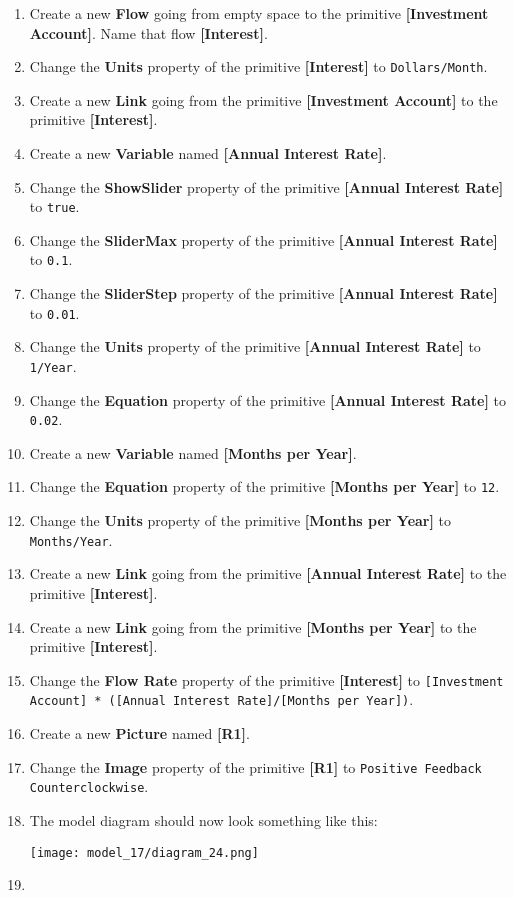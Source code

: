 \documentclass[]{memoir}
\makeatletter
\def\maxwidth{\ifdim\Gin@nat@width>\linewidth\linewidth
\else\Gin@nat@width\fi}
\let\Oldincludegraphics\includegraphics
\renewcommand{\includegraphics}[1]{\Oldincludegraphics[width=\maxwidth]{#1}}
\newcommand{\p}[1]{\textbf{{[}#1{]}}}
\newcommand{\e}[1]{\texttt{#1}}
\renewcommand{\a}[1]{\textbf{#1}}
\makeatother
\begin{document}
\begin{oframed}
\begin{enumerate}
\item Create a new \a{Flow} going from empty space to the primitive \p{Investment Account}. Name that flow \p{Interest}.
\item  Change the \a{Units} property of the primitive \p{Interest} to \e{Dollars/Month}.
\item Create a new \a{Link} going from the primitive \p{Investment Account} to the primitive \p{Interest}.
\item Create a new \a{Variable} named \p{Annual Interest Rate}.
\item  Change the \a{ShowSlider} property of the primitive \p{Annual Interest Rate} to \e{true}.
\item  Change the \a{SliderMax} property of the primitive \p{Annual Interest Rate} to \e{0.1}.
\item  Change the \a{SliderStep} property of the primitive \p{Annual Interest Rate} to \e{0.01}.
\item  Change the \a{Units} property of the primitive \p{Annual Interest Rate} to \e{1/Year}.
\item  Change the \a{Equation} property of the primitive \p{Annual Interest Rate} to \e{0.02}.
\item Create a new \a{Variable} named \p{Months per Year}.
\item  Change the \a{Equation} property of the primitive \p{Months per Year} to \e{12}.
\item  Change the \a{Units} property of the primitive \p{Months per Year} to \e{Months/Year}.
\item Create a new \a{Link} going from the primitive \p{Annual Interest Rate} to the primitive \p{Interest}.
\item Create a new \a{Link} going from the primitive \p{Months per Year} to the primitive \p{Interest}.
\item  Change the \a{Flow Rate} property of the primitive \p{Interest} to \e{[Investment Account] * ([Annual Interest Rate]/[Months per Year])}.
\item Create a new \a{Picture} named \p{R1}.
\item  Change the \a{Image} property of the primitive \p{R1} to \e{Positive Feedback Counterclockwise}.
\item The model diagram should now look something like this: \par \begin{minipage}{\linewidth}  \centering \texttt{[image: model\_17/diagram\_24.png]}
\end{minipage}
\item 


\end{enumerate}
\end{oframed}
\end{document}
